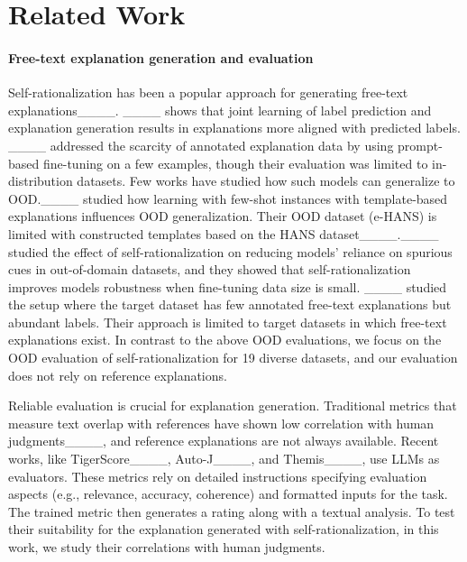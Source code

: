 \section{Related Work}
\paragraph{Free-text explanation generation and evaluation}
Self-rationalization has been a popular approach for generating free-text explanations____. ____ shows that joint learning of label prediction and explanation generation results in explanations more aligned with predicted labels. ____ addressed the scarcity of annotated explanation data by using prompt-based fine-tuning on a few examples, though their evaluation was limited to in-distribution datasets. Few works have studied how such models can generalize to OOD.____ studied how learning with few-shot instances with template-based explanations influences OOD generalization. Their OOD dataset (e-HANS) is limited with constructed templates based on the HANS dataset____.____ studied the effect of self-rationalization on reducing models' reliance on spurious cues in out-of-domain datasets, and they showed that self-rationalization improves models robustness when fine-tuning data size is small. ____ studied the setup where the target dataset has few annotated free-text explanations but abundant labels. Their approach is limited to target datasets in which free-text explanations exist. In contrast to the above OOD evaluations, we focus on the OOD evaluation of self-rationalization for 19 diverse datasets, and our evaluation does not rely on reference explanations.

Reliable evaluation is crucial for explanation generation. Traditional metrics that measure text overlap with references have shown low correlation with human judgments____, and reference explanations are not always available. Recent works, like TigerScore____, Auto-J____, and Themis____, use LLMs as evaluators. These metrics rely on detailed instructions specifying evaluation aspects (e.g., relevance, accuracy, coherence) and formatted inputs for the task. The trained metric then generates a rating along with a textual analysis.
To test their suitability for the explanation generated with self-rationalization, in this work, we study their correlations with human judgments.


